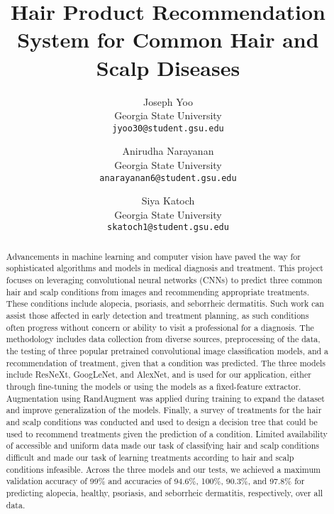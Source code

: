 \documentclass[10pt,twocolumn,letterpaper]{article}
\begin{document}
\title{Hair Product Recommendation System for Common Hair and Scalp Diseases}

\author{Joseph Yoo\\
Georgia State University\\
{\tt\small jyoo30@student.gsu.edu}
\and
Anirudha Narayanan\\
Georgia State University\\
{\tt\small anarayanan6@student.gsu.edu}
\and
Siya Katoch\\
Georgia State University\\
{\tt\small skatoch1@student.gsu.edu}
}


\maketitle

\begin{abstract}
Advancements in machine learning and computer vision have paved the way for sophisticated algorithms and models in medical diagnosis and treatment. This project focuses on leveraging convolutional neural networks (CNNs) to predict three common hair and scalp conditions from images and recommending appropriate treatments. These conditions include alopecia, psoriasis, and seborrheic dermatitis. Such work can assist those affected in early detection and treatment planning, as such conditions often progress without concern or ability to visit a professional for a diagnosis. The methodology includes data collection from diverse sources, preprocessing of the data, the testing of three popular pretrained convolutional image classification models, and a recommendation of treatment, given that a condition was predicted. The three models include ResNeXt, GoogLeNet, and AlexNet, and is used for our application, either through fine-tuning the models or using the models as a fixed-feature extractor. Augmentation using RandAugment was applied during training to expand the dataset and improve generalization of the models. Finally, a survey of treatments for the hair and scalp conditions was conducted and used to design a decision tree that could be used to recommend treatments given the prediction of a condition. Limited availability of accessible and uniform data made our task of classifying hair and scalp conditions difficult and made our task of learning treatments according to hair and scalp conditions infeasible. Across the three models and our tests, we achieved a maximum validation accuracy of 99\% and accuracies of 94.6\%, 100\%, 90.3\%, and 97.8\% for predicting alopecia, healthy, psoriasis, and seborrheic dermatitis, respectively, over all data.
\end{abstract}
\end{document}
